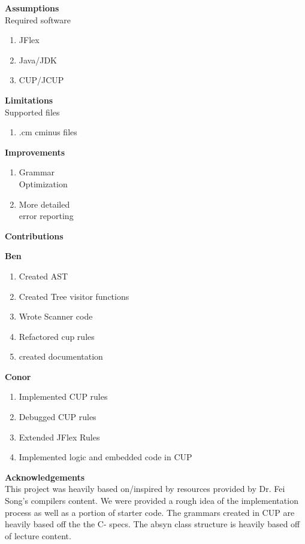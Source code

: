 \documentclass[12pt]{extarticle}
\begin{document}
\begin{multicols}{3}
    \textbf{Assumptions} \\
    Required software
    \begin{enumerate}
        \item JFlex
        \item Java/JDK
        \item CUP/JCUP
    \end{enumerate}
    \columnbreak
    \textbf{Limitations} \\
    Supported files
    \begin{enumerate}
        \item .cm cminus files
    \end{enumerate}
    \columnbreak
    \textbf{Improvements}
    \begin{enumerate}
        \item Grammar \\Optimization
        \item More detailed \\error reporting
    \end{enumerate}
\end{multicols}


\textbf{Contributions}

\begin{multicols}{2}
\textbf{Ben}
\begin{enumerate}
    \item Created AST
    \item Created Tree visitor functions
    \item Wrote Scanner code
    \item Refactored cup rules
    \item created documentation
\end{enumerate}
\columnbreak
\textbf{Conor}
\begin{enumerate}
    \item Implemented CUP rules
    \item Debugged CUP rules
    \item Extended JFlex Rules
    \item Implemented logic and embedded code in CUP
\end{enumerate}
\end{multicols}

\vspace{0.5cm}

\textbf{Acknowledgements} \\
This project was heavily based on/inspired by resources provided by Dr. Fei Song's compilers content. We were provided a rough idea of the implementation process as well as a portion of starter code. The grammars created in CUP are heavily based off the the C- specs. The absyn class structure is heavily based off of lecture content.
\end{document}
